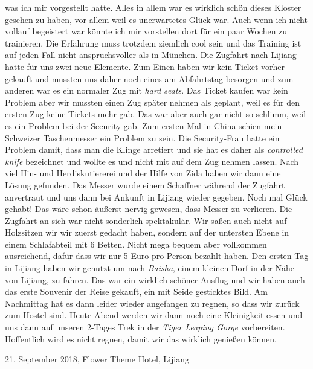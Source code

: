 \documentclass[11pt]{book}
\begin{document}
was ich mir vorgestellt hatte. Alles in allem war es wirklich schön dieses Kloster gesehen zu haben, vor allem 
weil es unerwartetes Glück war. Auch wenn ich nicht vollauf begeistert war könnte ich mir vorstellen dort für 
ein paar Wochen zu trainieren. Die Erfahrung muss trotzdem ziemlich cool sein und das Training ist auf jeden Fall 
nicht anspruchsvoller als in München.
Die Zugfahrt nach Lijiang hatte für uns zwei neue Elemente. Zum Einen haben wir kein Ticket vorher gekauft und 
mussten uns daher noch eines am Abfahrtstag besorgen und zum anderen war es ein normaler Zug mit \emph{hard seats}.
Das Ticket kaufen war kein Problem aber wir mussten einen Zug später nehmen als geplant, weil es für den ersten 
Zug keine Tickets mehr gab. Das war aber auch gar nicht so schlimm, weil es ein Problem bei der Security gab. Zum 
ersten Mal in China schien mein Schweizer Taschenmesser ein Problem zu sein. Die Security-Frau hatte ein Problem 
damit, dass man die Klinge arretiert und sie hat es daher als \emph{controlled knife} bezeichnet und wollte es 
und nicht mit auf dem Zug nehmen lassen. Nach viel Hin- und Herdiskutiererei und der Hilfe von Zida haben wir dann 
eine Lösung gefunden. Das Messer wurde einem Schaffner während der Zugfahrt anvertraut und uns dann bei Ankunft 
in Lijiang wieder gegeben. Noch mal Glück gehabt! Das wäre schon äußerst nervig gewesen, dass Messer zu verlieren.
Die Zugfahrt an sich war nicht sonderlich spektakulär. Wir saßen auch nicht auf Holzsitzen wir wir zuerst gedacht 
haben, sondern auf der untersten Ebene in einem Schlafabteil mit 6 Betten. Nicht mega bequem aber vollkommen ausreichend,
dafür dass wir nur 5 Euro pro Person bezahlt haben.
Den ersten Tag in Lijiang haben wir genutzt um nach \emph{Baisha}, einem kleinen Dorf in der Nähe von Lijiang, 
zu fahren. Das war ein wirklich schöner Ausflug und wir haben auch das erste Souvenir der Reise gekauft, ein mit 
Seide gesticktes Bild. Am Nachmittag hat es dann leider wieder angefangen zu regnen, so dass wir zurück zum Hostel 
sind. Heute Abend werden wir dann noch eine Kleinigkeit essen und uns dann auf unseren 2-Tages Trek in der 
\emph{Tiger Leaping Gorge} vorbereiten. Hoffentlich wird es nicht regnen, damit wir das wirklich genießen können.

21. September 2018, Flower Theme Hotel, Lijiang
\end{document}
